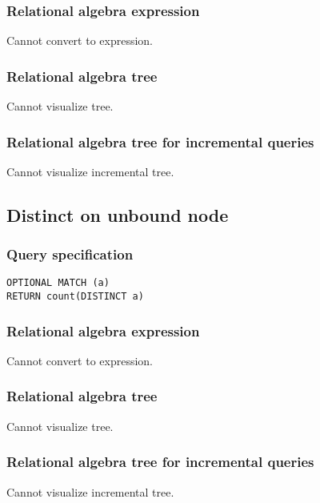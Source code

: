 \subsubsection*{Relational algebra expression}

Cannot convert to expression.

\subsubsection*{Relational algebra tree}

Cannot visualize tree.

\subsubsection*{Relational algebra tree for incremental queries}

Cannot visualize incremental tree.

\subsection{Distinct on unbound node}

\subsubsection*{Query specification}

\begin{lstlisting}
OPTIONAL MATCH (a)
RETURN count(DISTINCT a)
\end{lstlisting}

\subsubsection*{Relational algebra expression}

Cannot convert to expression.

\subsubsection*{Relational algebra tree}

Cannot visualize tree.

\subsubsection*{Relational algebra tree for incremental queries}

Cannot visualize incremental tree.

